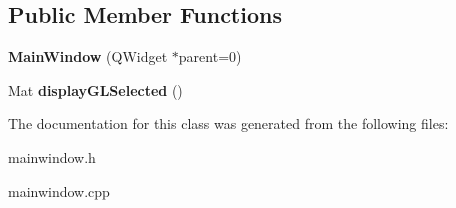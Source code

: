 \subsection*{Public Member Functions}
\begin{DoxyCompactItemize}
\item 
\mbox{\label{class_main_window_a8b244be8b7b7db1b08de2a2acb9409db}} 
{\bfseries Main\+Window} (Q\+Widget $\ast$parent=0)
\item 
\mbox{\label{class_main_window_af8e554c767131868b4b9a99aec48a349}} 
Mat {\bfseries display\+G\+L\+Selected} ()
\end{DoxyCompactItemize}


The documentation for this class was generated from the following files\+:\begin{DoxyCompactItemize}
\item 
mainwindow.\+h\item 
mainwindow.\+cpp\end{DoxyCompactItemize}
